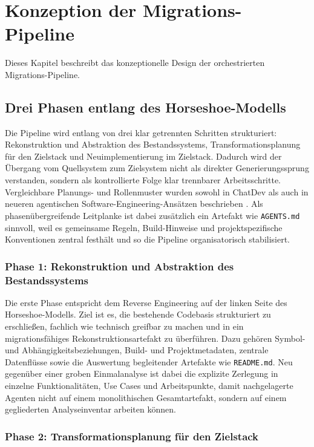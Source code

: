 \section{Konzeption der Migrations-Pipeline} \label{konzeption}

Dieses Kapitel beschreibt das konzeptionelle Design der orchestrierten Migrations-Pipeline.

\subsection{Drei Phasen entlang des Horseshoe-Modells}

Die Pipeline wird entlang von drei klar getrennten Schritten strukturiert: Rekonstruktion und Abstraktion des Bestandssystems, Transformationsplanung für den Zielstack und Neuimplementierung im Zielstack. Dadurch wird der Übergang vom Quellsystem zum Zielsystem nicht als direkter Generierungssprung verstanden, sondern als kontrollierte Folge klar trennbarer Arbeitsschritte. Vergleichbare Planungs- und Rollenmuster wurden sowohl in ChatDev als auch in neueren agentischen Software-Engineering-Ansätzen beschrieben \parencite{qian2024chatdev,yang2024sweagent,huang2024planningagents}. Als phasenübergreifende Leitplanke ist dabei zusätzlich ein Artefakt wie \texttt{AGENTS.md} sinnvoll, weil es gemeinsame Regeln, Build-Hinweise und projektspezifische Konventionen zentral festhält und so die Pipeline organisatorisch stabilisiert.

\subsubsection{Phase 1: Rekonstruktion und Abstraktion des Bestandssystems}

Die erste Phase entspricht dem Reverse Engineering auf der linken Seite des Horseshoe-Modells. Ziel ist es, die bestehende Codebasis strukturiert zu erschließen, fachlich wie technisch greifbar zu machen und in ein migrationsfähiges Rekonstruktionsartefakt zu überführen. Dazu gehören Symbol- und Abhängigkeitsbeziehungen, Build- und Projektmetadaten, zentrale Datenflüsse sowie die Auswertung begleitender Artefakte wie \texttt{README.md}. Neu gegenüber einer groben Einmalanalyse ist dabei die explizite Zerlegung in einzelne Funktionalitäten, Use Cases und Arbeitspunkte, damit nachgelagerte Agenten nicht auf einem monolithischen Gesamtartefakt, sondern auf einem gegliederten Analyseinventar arbeiten können.

\subsubsection{Phase 2: Transformationsplanung für den Zielstack}


